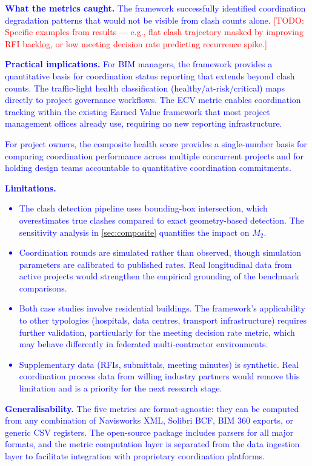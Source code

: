 \documentclass[conference]{IEEEtran}
\newcommand{\todo}[1]{\textcolor{red}{[TODO: #1]}}
\newcommand{\placeholder}[1]{\textcolor{blue}{#1}}
\begin{document}
\placeholder{
\textbf{What the metrics caught.} The framework successfully identified coordination degradation patterns that would not be visible from clash counts alone. \todo{Specific examples from results --- e.g., flat clash trajectory masked by improving RFI backlog, or low meeting decision rate predicting recurrence spike.}

\textbf{Practical implications.} For BIM managers, the framework provides a quantitative basis for coordination status reporting that extends beyond clash counts. The traffic-light health classification (healthy/at-risk/critical) maps directly to project governance workflows. The ECV metric enables coordination tracking within the existing Earned Value framework that most project management offices already use, requiring no new reporting infrastructure.

For project owners, the composite health score provides a single-number basis for comparing coordination performance across multiple concurrent projects and for holding design teams accountable to quantitative coordination commitments.

\textbf{Limitations.}
\begin{itemize}
    \item The clash detection pipeline uses bounding-box intersection, which overestimates true clashes compared to exact geometry-based detection. The sensitivity analysis in \cref{sec:composite} quantifies the impact on $M_2$.
    \item Coordination rounds are simulated rather than observed, though simulation parameters are calibrated to published rates. Real longitudinal data from active projects would strengthen the empirical grounding of the benchmark comparisons.
    \item Both case studies involve residential buildings. The framework's applicability to other typologies (hospitals, data centres, transport infrastructure) requires further validation, particularly for the meeting decision rate metric, which may behave differently in federated multi-contractor environments.
    \item Supplementary data (RFIs, submittals, meeting minutes) is synthetic. Real coordination process data from willing industry partners would remove this limitation and is a priority for the next research stage.
\end{itemize}

\textbf{Generalisability.} The five metrics are format-agnostic: they can be computed from any combination of Navisworks XML, Solibri BCF, BIM 360 exports, or generic CSV registers. The open-source package includes parsers for all major formats, and the metric computation layer is separated from the data ingestion layer to facilitate integration with proprietary coordination platforms.
}
\end{document}
